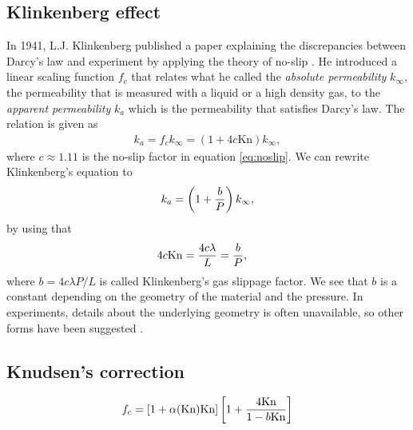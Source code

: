 \subsection{Klinkenberg effect}
In 1941, L.J. Klinkenberg published a paper explaining the discrepancies between Darcy's law and experiment by applying the theory of no-slip \cite{klinkenberg1941permeability}. He introduced a linear scaling function $f_c$ that relates what he called the \textit{absolute permeability} $k_\infty$, the permeability that is measured with a liquid or a high density gas, to the \textit{apparent permeability} $k_a$ which is the permeability that satisfies Darcy's law. The relation is given as
\begin{align}
	k_a = f_c k_\infty = \left(1 + 4c\text{Kn}\right)k_\infty,
\end{align}
where $c\approx 1.11$ is the no-slip factor in equation \eqref{eq:noslip}. We can rewrite Klinkenberg's equation to 
\begin{align}
	k_a = \left(1 + {b\over P}\right)k_\infty,
\end{align}
by using that
\begin{align}
	4c\text{Kn} &= {4c\lambda \over L} = {b\over P},
\end{align}
where $b=4c\lambda P / L$ is called Klinkenberg's gas slippage factor. We see that $b$ is a constant depending on the geometry of the material and the pressure. In experiments, details about the underlying geometry is often unavailable, so other forms have been suggested \cite{ziarani2012knudsen}.
\subsection{Knudsen's correction}
\label{sec:knudsen_correction}
\begin{align}
	\label{eq:knudsen_correction}
	f_c = [1 + \alpha(\text{Kn})\text{Kn}]\left[1 + {4\text{Kn}\over 1 - b\text{Kn}}\right]
\end{align}
